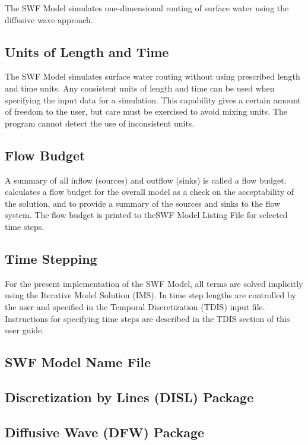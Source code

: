 The SWF Model simulates one-dimensional routing of surface water using the diffusive wave approach.

\subsection{Units of Length and Time}
The SWF Model simulates surface water routing without using prescribed length and time units. Any consistent units of length and time can be used when specifying the input data for a simulation. This capability gives a certain amount of freedom to the user, but care must be exercised to avoid mixing units.  The program cannot detect the use of inconsistent units.

\subsection{Flow Budget}
A summary of all inflow (sources) and outflow (sinks) is called a flow budget.  \mf calculates a flow budget for the overall model as a check on the acceptability of the solution, and to provide a summary of the sources and sinks to the flow system.  The flow budget is printed to theSWF Model Listing File for selected time steps.

\subsection{Time Stepping}

For the present implementation of the SWF Model, all terms are solved implicitly using the Iterative Model Solution (IMS).  In \mf time step lengths are controlled by the user and specified in the Temporal Discretization (TDIS) input file.  Instructions for specifying time steps are described in the TDIS section of this user guide.  

\newpage
\subsection{SWF Model Name File}


\newpage
\subsection{Discretization by Lines (DISL) Package}


\newpage
\subsection{Diffusive Wave (DFW) Package}


